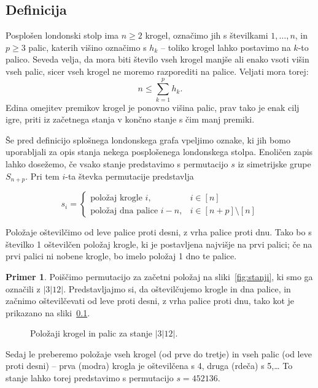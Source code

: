 \documentclass[12pt,a4paper]{amsart}
\theoremstyle{definition} %
\newtheorem{primer}[definicija]{Primer}
\theoremstyle{plain} %
\begin{document}
\subsection{Definicija}

Posplošen londonski stolp ima $n \geq 2$ krogel, označimo jih s številkami $1,\ldots,n$, in $p \geq 3$ palic, katerih višino označimo s $h_k$ -- toliko krogel lahko postavimo na $k$-to palico. Seveda velja, da mora biti število vseh krogel manjše ali enako vsoti višin vseh palic, sicer vseh krogel ne moremo razporediti na palice. Veljati mora torej:
\[ n \leq \sum_{k=1}^{p} h_k.\]
Edina omejitev premikov krogel je ponovno višina palic, prav tako je enak cilj igre, priti iz začetnega stanja v končno stanje s čim manj premiki.

Še pred definicijo splošnega londonskega grafa vpeljimo oznake, ki jih bomo uporabljali za opis stanja nekega posplošenega londonskega stolpa. Enoličen zapis lahko dosežemo, če vsako stanje predstavimo s permutacijo $s$ iz simetrijske grupe $S_{n+p}$. Pri tem $i$-ta števka permutacije predstavlja

\[ s_i =
\begin{cases}
    \text{položaj krogle } i, & i \in [n] \\
    \text{položaj dna palice } i-n, & i \in [n+p] \setminus [n]
\end{cases}
\]

Položaje oštevilčimo od leve palice proti desni, z vrha palice proti dnu. Tako bo s številko 1 oštevilčen položaj krogle, ki je postavljena najvišje na prvi palici; če na prvi palici ni nobene krogle, bo imelo položaj 1 dno te palice.

\begin{primer}
    Poiščimo permutacijo za začetni položaj na sliki~\ref{fig:stanji}, ki smo ga označili z $|3|12|$. 
    Predstavljajmo si, da oštevilčujemo krogle in dna palice, in začnimo oštevilčevati od leve proti desni, z vrha palice proti dnu, tako kot je prikazano na sliki~\ref{}.
    
    \begin{figure}[h]
        \caption{Položaji krogel in palic za stanje $|3|12|$.}
    \end{figure}
    
    Sedaj le preberemo položaje vseh krogel (od prve do tretje) in vseh palic (od leve proti desni) -- prva (modra) krogla je oštevilčena s 4, druga (rdeča) s 5,\ldots
    To stanje lahko torej predstavimo s permutacijo $s=452136$.
\end{primer}
\end{document}
